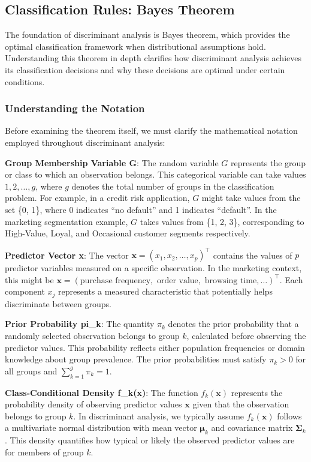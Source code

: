 \documentclass[
]{article}
\begin{document}
\subsection{Classification Rules: Bayes Theorem}

The foundation of discriminant analysis is Bayes theorem, which provides
the optimal classification framework when distributional assumptions
hold. Understanding this theorem in depth clarifies how discriminant
analysis achieves its classification decisions and why these decisions
are optimal under certain conditions.

\subsubsection{Understanding the Notation}

Before examining the theorem itself, we must clarify the mathematical
notation employed throughout discriminant analysis:

\textbf{Group Membership Variable G}: The random variable \(G\)
represents the group or class to which an observation belongs. This
categorical variable can take values \(1,2,\ldots,g\), where \(g\)
denotes the total number of groups in the classification problem. For
example, in a credit risk application, \(G\) might take values from the
set \{0, 1\}, where 0 indicates ``no default'' and 1 indicates
``default''. In the marketing segmentation example, \(G\) takes values
from \{1, 2, 3\}, corresponding to High-Value, Loyal, and Occasional
customer segments respectively.

\textbf{Predictor Vector x}: The vector
\(\mathbf{x} = \left( x_{1},x_{2},\ldots,x_{p} \right)^{\top}\) contains
the values of \(p\) predictor variables measured on a specific
observation. In the marketing context, this might be
\(\mathbf{x} = \left( \text{purchase frequency},\text{ order value},\text{ browsing time},\ldots \right)^{\top}\).
Each component \(x_{j}\) represents a measured characteristic that
potentially helps discriminate between groups.

\textbf{Prior Probability pi\_k}: The quantity \(\pi_{k}\) denotes the
prior probability that a randomly selected observation belongs to group
\(k\), calculated before observing the predictor values. This
probability reflects either population frequencies or domain knowledge
about group prevalence. The prior probabilities must satisfy
\(\pi_{k} > 0\) for all groups and \(\sum_{k = 1}^{g}\pi_{k} = 1\).

\textbf{Class-Conditional Density f\_k(x)}: The function
\(f_{k}\left( \mathbf{x} \right)\) represents the probability density of
observing predictor values \(\mathbf{x}\) given that the observation
belongs to group \(k\). In discriminant analysis, we typically assume
\(f_{k}\left( \mathbf{x} \right)\) follows a multivariate normal
distribution with mean vector \(\mathbf{\mu}_{k}\) and covariance matrix
\(\mathbf{\Sigma}_{k}\). This density quantifies how typical or likely
the observed predictor values are for members of group \(k\).
\end{document}
